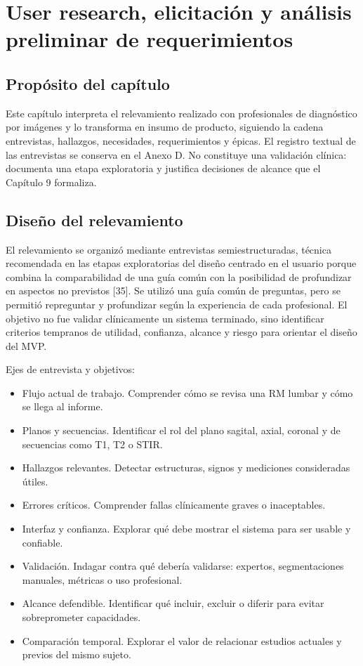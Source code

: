 \chapter{User research, elicitación y análisis preliminar de requerimientos}

\section{Propósito del capítulo}

Este capítulo interpreta el relevamiento realizado con profesionales de diagnóstico por imágenes y lo transforma en insumo de producto, siguiendo la cadena entrevistas, hallazgos, necesidades, requerimientos y épicas. El registro textual de las entrevistas se conserva en el Anexo D. No constituye una validación clínica: documenta una etapa exploratoria y justifica decisiones de alcance que el Capítulo 9 formaliza.

\section{Diseño del relevamiento}

El relevamiento se organizó mediante entrevistas semiestructuradas, técnica recomendada en las etapas exploratorias del diseño centrado en el usuario porque combina la comparabilidad de una guía común con la posibilidad de profundizar en aspectos no previstos [35]. Se utilizó una guía común de preguntas, pero se permitió repreguntar y profundizar según la experiencia de cada profesional. El objetivo no fue validar clínicamente un sistema terminado, sino identificar criterios tempranos de utilidad, confianza, alcance y riesgo para orientar el diseño del MVP.

Ejes de entrevista y objetivos:

\begin{itemize}
  \item Flujo actual de trabajo. Comprender cómo se revisa una RM lumbar y cómo se llega al informe.
  \item Planos y secuencias. Identificar el rol del plano sagital, axial, coronal y de secuencias como T1, T2 o STIR.
  \item Hallazgos relevantes. Detectar estructuras, signos y mediciones consideradas útiles.
  \item Errores críticos. Comprender fallas clínicamente graves o inaceptables.
  \item Interfaz y confianza. Explorar qué debe mostrar el sistema para ser usable y confiable.
  \item Validación. Indagar contra qué debería validarse: expertos, segmentaciones manuales, métricas o uso profesional.
  \item Alcance defendible. Identificar qué incluir, excluir o diferir para evitar sobreprometer capacidades.
  \item Comparación temporal. Explorar el valor de relacionar estudios actuales y previos del mismo sujeto.
\end{itemize}


